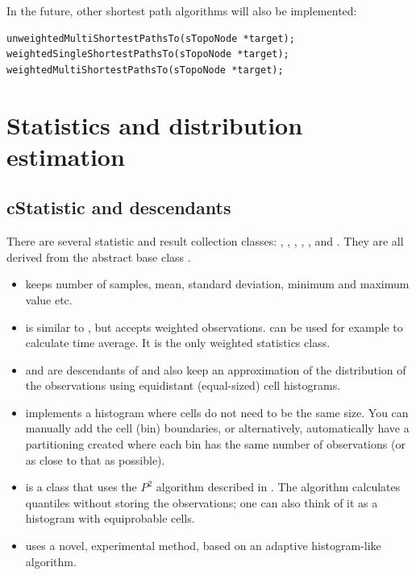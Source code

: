 In the future, other shortest path algorithms will also be implemented:

\begin{verbatim}
unweightedMultiShortestPathsTo(sTopoNode *target);
weightedSingleShortestPathsTo(sTopoNode *target);
weightedMultiShortestPathsTo(sTopoNode *target);
\end{verbatim}






\section{Statistics and distribution estimation}

\subsection{cStatistic and descendants}

There are several statistic and result collection classes:
, , ,
, ,  and
. They are all derived from the abstract base class
.

\begin{itemize}
  \item{ keeps number of samples, mean, standard
    deviation, minimum and maximum value etc.}
  \item{ is similar to , but
    accepts weighted observations.  can be used
    for example to calculate time average. It is the only weighted
    statistics class.}
  \item{ and  are
    descendants of  and also keep an approximation of
    the distribution of the observations using equidistant
    (equal-sized) cell histograms.}
  \item{ implements a histogram where cells do not
    need to be the same size. You can manually add the cell (bin)
    boundaries, or alternatively, automatically have a partitioning
    created where each bin has the same number of observations (or as
    close to that as possible).}
  \item{ is a class that uses the $P^{2}$ algorithm
    described in \cite{JCh85}. The algorithm calculates quantiles without
    storing the observations; one can also think of it as a histogram
    with equiprobable cells.}
  \item{ uses a novel, experimental method, based on an
    adaptive histogram-like algorithm.}
\end{itemize}


